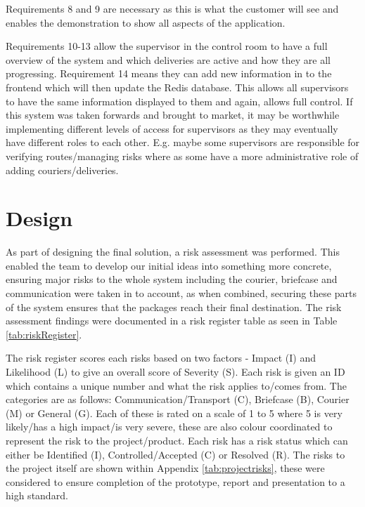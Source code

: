 Requirements 8 and 9 are necessary as this is what the customer will see and enables the demonstration to show all aspects of the application.

Requirements 10-13 allow the supervisor in the control room to have a full overview of the system and which deliveries are active and how they are all progressing. Requirement 14 means they can add new information in to the frontend which will then update the Redis database. This allows all supervisors to have the same information displayed to them and again, allows full control. If this system was taken forwards and brought to market, it may be worthwhile implementing different levels of access for supervisors as they may eventually have different roles to each other. E.g. maybe some supervisors are responsible for verifying routes/managing risks where as some have a more administrative role of adding couriers/deliveries.




\section{Design}

As part of designing the final solution, a risk assessment was performed. This enabled the team to develop our initial ideas into something more concrete, ensuring major risks to the whole system including the courier, briefcase and communication were taken in to account, as when combined, securing these parts of the system ensures that the packages reach their final destination. The risk assessment findings were documented in a risk register table as seen in Table \ref{tab:riskRegister}.

The risk register scores each risks based on two factors - Impact (I) and Likelihood (L) to give an overall score of Severity (S). Each risk is given an ID which contains a unique number and what the risk applies to/comes from. The categories are as follows: Communication/Transport (C), Briefcase (B), Courier  (M) or General (G). Each of these is rated on a scale of 1 to 5 where 5 is very likely/has a high impact/is very severe, these are also colour coordinated to represent the risk to the project/product. Each risk has a risk status which can either be Identified (I), Controlled/Accepted (C) or Resolved (R). The risks to the project itself are shown within Appendix \ref{tab:projectrisks}, these were considered to ensure completion of the prototype, report and presentation to a high standard.


